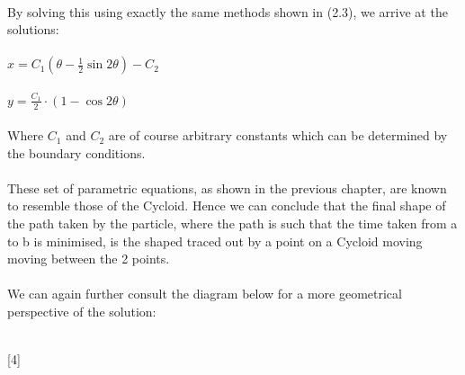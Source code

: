 \documentclass[12pt]{report}
\begin{document}
\\
By solving this using exactly the same methods shown in (2.3), we arrive at the solutions:
\\
\\
\(x = C_{1} (\theta-\frac{1}{2}\sin{2\theta}) - C_{2}\)
\\
\\
\(y =\frac{C_{1}}{2} \cdot (1-\cos{2\theta}) \)
\\
\\
Where \(C_{1}\) and \(C_{2}\) are of course arbitrary constants which can be determined by the boundary conditions.
\\
\\
These set of parametric equations, as shown in the previous chapter, are known to resemble those of the Cycloid. Hence we can conclude that the final shape of the path taken by the particle, where the path is such that the time taken from a to b is minimised, is the shaped traced out by a point on a Cycloid moving moving between the 2 points.
\\
\\
We can again further consult the diagram below for a more geometrical perspective of the solution:
\\
\\
 [4]
\end{document}
